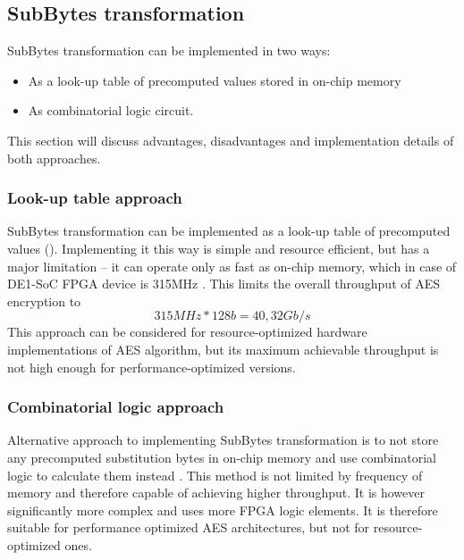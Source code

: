 \subsection{SubBytes transformation}
\label{sec:sub-bytes}

SubBytes transformation can be implemented in two ways:
\begin{itemize}[nolistsep]
\item As a look-up table of precomputed values stored in on-chip memory
\item As combinatorial logic circuit.
\end{itemize}
This section will discuss advantages, disadvantages and implementation details of both approaches.

\subsubsection{Look-up table approach}
SubBytes transformation can be implemented as a look-up table of precomputed values (\cite[Fig. 7]{aes-standard}). Implementing it this way is simple and resource efficient, but has a major limitation -- it can operate only as fast as on-chip memory, which in case of DE1-SoC FPGA device is 315MHz \cite[Table 2-1]{altera-vol1}. This limits the overall throughput of AES encryption to
$$
315MHz * 128b = 40,32Gb/s
$$
This approach can be considered for resource-optimized hardware implementations of AES algorithm, but its maximum achievable throughput is not high enough for performance-optimized versions.

\subsubsection{Combinatorial logic approach}
\label{sec:comb-theory}
Alternative approach to implementing SubBytes transformation is to not store any precomputed substitution bytes in on-chip memory and use combinatorial logic to calculate them instead \cite{practical-sub-bytes}. This method is not limited by frequency of memory and therefore capable of achieving higher throughput. It is however significantly more complex and uses more FPGA logic elements. It is therefore suitable for performance optimized AES architectures, but not for resource-optimized ones.

